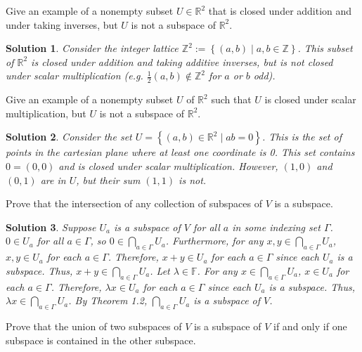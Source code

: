 \documentclass{book}
\newcommand{\integer}{\mathbb{Z}}
\newcommand{\real}{\mathbb{R}}
\newcommand{\field}{\mathbb{F}}
\newcommand{\set}[2]{\left\{#1\;\vert\;#2\right\}}
\newtheorem*{soln}{Solution}
\theoremstyle{definition}
\begin{document}
\begin{problem}
    Give an example of a nonempty subset $U\in\real^2$ that is closed under
    addition and under taking inverses, but $U$ is not a subspace of $\real^2$.
\end{problem}

\begin{soln}
    Consider the integer lattice $\integer^2:= \set{(a,b)}{a,b\in\integer}$.
    This subset of $\real^2$ is closed under addition and taking additive
    inverses, but is not closed under scalar multiplication (e.g. $\frac{1}{2}
    (a,b)\notin \integer^2$ for $a$ or $b$ odd).
\end{soln}

\begin{problem}
    Give an example of a nonempty subset $U$ of $\real^2$ such that $U$ is
    closed under scalar multiplication, but $U$ is not a subspace of $\real^2$.
\end{problem}

\begin{soln}
    Consider the set $U = \set{(a,b)\in\real^2}{ab=0}$. This is the set of
    points in the cartesian plane where at least one coordinate is 0. This set
    contains $0 = (0,0)$ and is closed under scalar multiplication. However,
    $(1,0)$ and $(0,1)$ are in $U$, but their sum $(1,1)$ is not.
\end{soln}

\begin{problem}
    Prove that the intersection of any collection of subspaces of $V$ is a
    subspace.
\end{problem}

\begin{soln}
    Suppose $U_a$ is a subspace of $V$ for all $a$ in some indexing set
    $\Gamma$. $0\in U_a$ for all $a\in\Gamma$, so $0\in \bigcap_{a\in\Gamma}U_a$.
    Furthermore, for any $x,y \in \bigcap_{a\in\Gamma}U_a$, $x,y\in U_a$ for each
    $a\in\Gamma$. Therefore, $x+y \in U_a$ for each $a\in\Gamma$ since each
    $U_a$ is a subspace. Thus, $x+y \in \bigcap_{a\in\Gamma}U_a$. Let $\lambda
    \in \field$. For any $x \in \bigcap_{a\in\Gamma}U_a$, $x\in U_a$ for each
    $a\in\Gamma$. Therefore, $\lambda x \in U_a$ for each $a\in\Gamma$ since each
    $U_a$ is a subspace. Thus, $\lambda x \in \bigcap_{a\in\Gamma}U_a$. By
    Theorem 1.2, $\bigcap_{a\in\Gamma}U_a$ is a subspace of $V$.
\end{soln}

\begin{problem}
    Prove that the union of two subspaces of $V$ is a subspace of $V$ if and
    only if one subspace is contained in the other subspace.
\end{problem}
\end{document}
